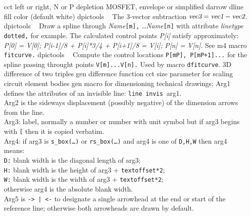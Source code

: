 %
  {cct}%
  {left or right, N or P depletion MOSFET, envelope or simplified
    }%
%
  {darrow}%
  {dline fill color (default white)}%
%
  {dpictools}%
  {$\;\;$ The 3-vector subtraction
    $\hbox{\sl vec3} = \hbox{\sl vec1} - \hbox{\sl vec2}$.}%
%
  {dpictools}%
  {$\;\;$ Draw a spline through {\sl Name}{\tt [m],} \ldots {\sl Name}{\tt [n]}
   with attribute {\sl linetype} {\tt dotted,} for example.
   The calculated control points {\sl P[i]} satisfy approximately:
   {\sl P[0] = V[0];} {\sl P[i-1]/8 + P[i]*3/4 + P[i+1]/8 = V[i];}
   {\sl P[n] = V[n].}  See m4 macro {\tt fitcurve.}}%
%
  {dpictools}%
  {$\;\;$ Compute the control locations {\tt P[mP], P[mP+1]...} for
  the spline passing throught points {\tt V[m]...V[n].}  Used by
  macro {\tt dfitcurve}.}%
%
  {3D}%
  {difference of two triples}%
%
  {gen}%
  {difference function}%
%
  {cct}%
  {size parameter for scaling circuit element bodies }%
%
  {gen}%
  {macro for dimensioning technical drawings;
      Arg1 defines the attributes
      of an invisible line: {\tt line invis }arg1.\\
      Arg2 is the sideways displacement (possibly negative) of the
      dimension arrows from the line.\\
      Arg3: label, normally a number or number with unit symbol but
        if arg3 begins with {\tt [} then it is copied verbatim.\\
      Arg4: if arg3 is {\tt s\_box(\ldots)} or {\tt rs\_box(\ldots)} and
      arg4 is one of {\tt D,H,W} then arg4 means:\\
      {\tt D:} blank width is the diagonal length of arg3;\\
      {\tt H:} blank width is the height of arg3 + {\tt textoffset*2};\\
      {\tt W:} blank width is the width of arg3 + {\tt textoffset*2};\\
      otherwise arg4 is the absolute blank width.\\
      Arg5 is {\tt -> | <-} to designate a single arrowhead
      at the end or start of the reference line; otherwise both arrowheads
      are drawn by default.}%
